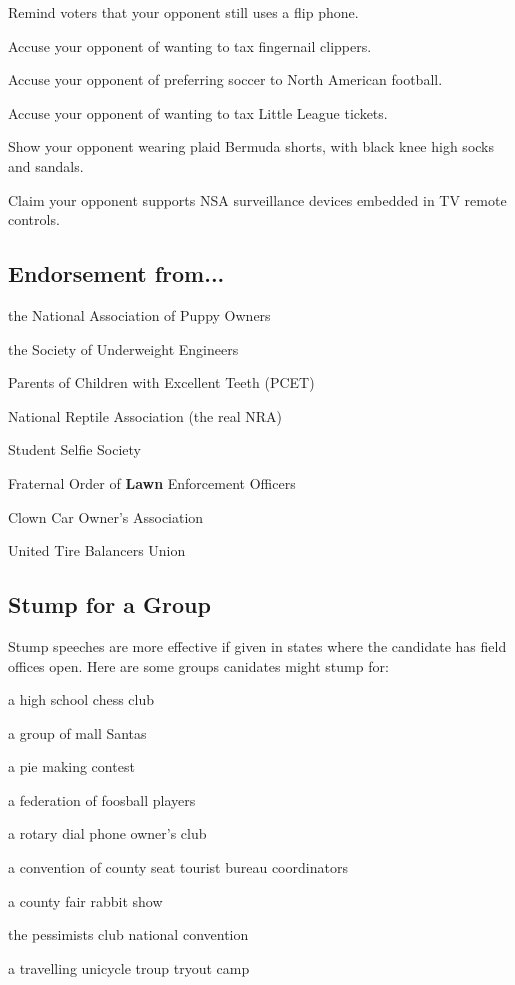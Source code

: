 \documentclass[twocolumn]{article}
\begin{document}
Remind voters that your opponent still uses a flip phone.

Accuse your opponent of wanting to tax fingernail clippers.

Accuse your opponent of preferring soccer to North American football.

Accuse your opponent of wanting to tax Little League tickets.

Show your opponent wearing plaid Bermuda shorts, with black knee high socks and sandals.

Claim your opponent supports NSA surveillance devices embedded in TV remote controls.

\subsection{Endorsement from...}

the National Association of Puppy Owners

the Society of Underweight Engineers

Parents of Children with Excellent Teeth (PCET)

National Reptile Association (the real NRA)

Student Selfie Society

Fraternal Order of \textbf{Lawn} Enforcement Officers

Clown Car Owner's Association

United Tire Balancers Union

\subsection{Stump for a Group}

Stump speeches are more effective if given in states where the candidate has field offices open. Here are some groups canidates might stump for:

a high school chess club

a group of mall Santas

a pie making contest

a federation of foosball players

a rotary dial phone owner's club

a convention of county seat tourist bureau coordinators

a county fair rabbit show

the pessimists club national convention

a travelling unicycle troup tryout camp
\end{document}
